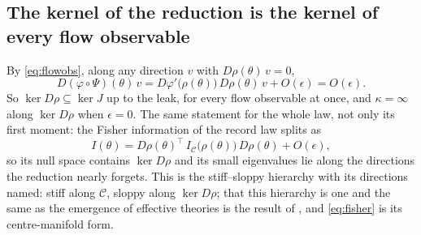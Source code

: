 \documentclass[10pt]{article}
\begin{document}
\subsection{The kernel of the reduction is the kernel of every flow observable}
By \eqref{eq:flowobs}, along any direction $v$ with $D\rho(\theta)\,v=0$,
\begin{equation}
D(\varphi\circ\Psi)(\theta)\,v=D\varphi'\bigl(\rho(\theta)\bigr)\,D\rho(\theta)\,v+O(\epsilon)=O(\epsilon).
\label{eq:kernel}
\end{equation}
So $\ker D\rho\subseteq\ker J$ up to the leak, for every flow observable at once, and $\kappa=\infty$ along $\ker D\rho$ when $\epsilon=0$. The same statement for the whole law, not only its first moment: the Fisher information of the record law splits as
\begin{equation}
I(\theta)=D\rho(\theta)^{\top}\,I_{\mathcal{C}}\bigl(\rho(\theta)\bigr)\,D\rho(\theta)+O(\epsilon),
\label{eq:fisher}
\end{equation}
so its null space contains $\ker D\rho$ and its small eigenvalues lie along the directions the reduction nearly forgets. This is the stiff--sloppy hierarchy with its directions named: stiff along $\mathcal{C}$, sloppy along $\ker D\rho$; that this hierarchy is one and the same as the emergence of effective theories is the result of \textcite{machta2013}, and \eqref{eq:fisher} is its centre-manifold form.
\end{document}
